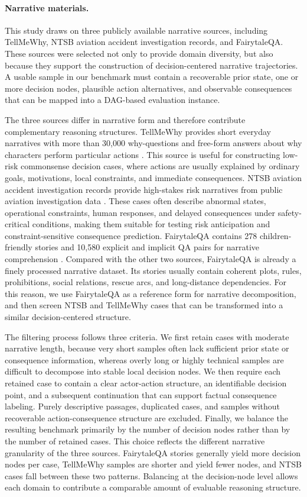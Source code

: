 \documentclass[pdflatex,sn-mathphys-num]{sn-jnl}%
\theoremstyle{thmstyleone}%
\theoremstyle{thmstyletwo}%
\theoremstyle{thmstylethree}%
\begin{document}
\paragraph{Narrative materials.}
This study draws on three publicly available narrative sources, including TellMeWhy, NTSB aviation accident investigation records, and FairytaleQA. These sources were selected not only to provide domain diversity, but also because they support the construction of decision-centered narrative trajectories. A usable sample in our benchmark must contain a recoverable prior state, one or more decision nodes, plausible action alternatives, and observable consequences that can be mapped into a DAG-based evaluation instance.

The three sources differ in narrative form and therefore contribute complementary reasoning structures. TellMeWhy provides short everyday narratives with more than 30,000 why-questions and free-form answers about why characters perform particular actions \cite{lal2021tellmewhy}. This source is useful for constructing low-risk commonsense decision cases, where actions are usually explained by ordinary goals, motivations, local constraints, and immediate consequences. NTSB aviation accident investigation records provide high-stakes risk narratives from public aviation investigation data \cite{ntsbCarol}. These cases often describe abnormal states, operational constraints, human responses, and delayed consequences under safety-critical conditions, making them suitable for testing risk anticipation and constraint-sensitive consequence prediction. FairytaleQA contains 278 children-friendly stories and 10,580 explicit and implicit QA pairs for narrative comprehension \cite{xu2022fantastic}. Compared with the other two sources, FairytaleQA is already a finely processed narrative dataset. Its stories usually contain coherent plots, rules, prohibitions, social relations, rescue arcs, and long-distance dependencies. For this reason, we use FairytaleQA as a reference form for narrative decomposition, and then screen NTSB and TellMeWhy cases that can be transformed into a similar decision-centered structure.

The filtering process follows three criteria. We first retain cases with moderate narrative length, because very short samples often lack sufficient prior state or consequence information, whereas overly long or highly technical samples are difficult to decompose into stable local decision nodes. We then require each retained case to contain a clear actor-action structure, an identifiable decision point, and a subsequent continuation that can support factual consequence labeling. Purely descriptive passages, duplicated cases, and samples without recoverable action-consequence structure are excluded. Finally, we balance the resulting benchmark primarily by the number of decision nodes rather than by the number of retained cases. This choice reflects the different narrative granularity of the three sources. FairytaleQA stories generally yield more decision nodes per case, TellMeWhy samples are shorter and yield fewer nodes, and NTSB cases fall between these two patterns. Balancing at the decision-node level allows each domain to contribute a comparable amount of evaluable reasoning structure.
\end{document}
